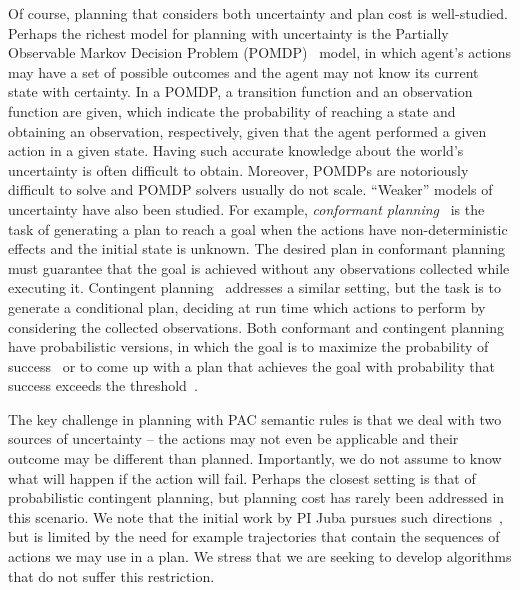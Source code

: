 \documentclass[12pt]{article}
\newcommand{\note}[1]{\textbf{\textit{#1}}}
\begin{document}
Of course, planning that considers both uncertainty and plan cost is well-studied. Perhaps the richest model for planning with uncertainty is the Partially Observable Markov Decision Problem (POMDP)~\cite{cassandra1994acting}
model, in which agent's actions may have a set of possible outcomes and the agent may not know its current state with certainty. 
In a POMDP, a transition function and an observation function are given, which indicate the probability of reaching a state and obtaining an observation, respectively, given that the agent performed a given action in a given state. Having such accurate knowledge about the world's uncertainty is often difficult to obtain. Moreover, POMDPs are notoriously difficult to solve and POMDP solvers usually do not scale. %
``Weaker'' models of uncertainty have also been studied. 
For example, {\em conformant planning}~\cite{hoffmann2006conformant,cimatti2004conformant,cimatti1999conformant} is the task of generating a plan to reach a goal when the actions have non-deterministic effects
and the initial state is unknown. The desired plan in conformant planning must guarantee that the goal is achieved without any observations collected while executing it. Contingent planning~\cite{hoffmann2005contingent,majercik2003contingent} addresses a similar setting, but the task is to generate a conditional plan, deciding at run time which actions to perform by considering the collected observations. 
Both conformant and contingent planning have probabilistic versions,
in which the goal is to maximize the probability of success~\cite{blum1999probabilistic,taig2015compilation,markou2016cost} 
or to come up with a plan that achieves the goal with probability that success exceeds the threshold~\cite{kushmerick1995algorithm}.

The key challenge in planning with PAC semantic rules is that
we deal with two sources of uncertainty -- the actions  may not even be applicable and their outcome may be different than planned. Importantly, we do not assume to know what will happen if the action will fail. Perhaps the closest setting is that of probabilistic contingent planning, but planning cost has rarely been addressed in this scenario. We note that the initial work by PI Juba pursues such directions~\cite{juba2016jmlr}, but is limited by the need for example trajectories that contain the sequences of actions we may use in a plan. We stress that we are seeking to develop algorithms that do not suffer this restriction.
\end{document}
